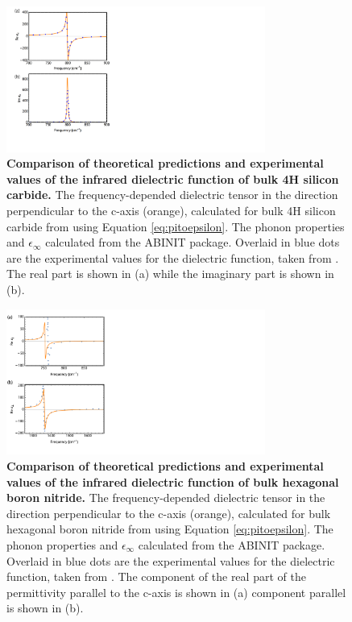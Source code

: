\documentclass[aps,prb,twocolumn,
	groupedaddress,superscriptaddress,
	amsfonts,amssymb,amsmath,floatfix,
	citeautoscript]{revtex4-1}
\begin{document}
\begin{figure}[t]
\includegraphics[width=8.5cm]{SiC_comparison_thy_vs_expt.pdf}
\caption{\textbf{Comparison of theoretical predictions and experimental values of the infrared dielectric function of bulk 4H silicon carbide.} The frequency-depended dielectric tensor in the direction perpendicular to the c-axis (orange), calculated for bulk 4H silicon carbide from using Equation \ref{eq:pitoepsilon}. The phonon properties and $\epsilon_{\infty}$ calculated from the ABINIT package. Overlaid in blue dots are the experimental values for the dielectric function, taken from \cite{tiwald1999carrier}. The real part is shown in (a) while the imaginary part is shown in (b). }
\label{fig:sicepsilon}
\end{figure}

\begin{figure}[t]
\includegraphics[width=8.5cm]{hBN_comparison_thy_vs_expt.pdf}
\caption{\textbf{Comparison of theoretical predictions and experimental values of the infrared dielectric function of bulk hexagonal boron nitride.} The frequency-depended dielectric tensor in the direction perpendicular to the c-axis (orange), calculated for bulk hexagonal boron nitride from using Equation \ref{eq:pitoepsilon}. The phonon properties and $\epsilon_{\infty}$ calculated from the ABINIT package. Overlaid in blue dots are the experimental values for the dielectric function, taken from \cite{caldwell2014sub}. The component of the real part of the permittivity parallel to the c-axis is shown in (a) component parallel is shown in (b).}
\label{fig:hbnepsilon}
\end{figure}
\end{document}
